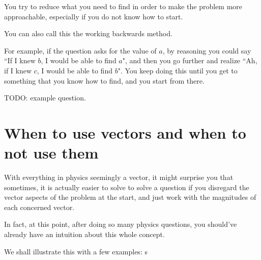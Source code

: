 \documentclass[11pt]{article}
\begin{document}
	You try to reduce what you need to find in order to make the problem more approachable, especially if you do not know how to start. 
	
	You can also call this the working backwards method. 
	
	For example, if the question asks for the value of $a$, by reasoning you could say ``If I knew $b$, I would be able to find $a$", and then you go further and realize ``Ah, if I knew $c$, I would be able to find $b$". You keep doing this until you get to something that you know how to find, and you start from there. 
	
	TODO: example question.
	
	\section{When to use vectors and when to not use them}
	With everything in physics seemingly a vector, it might surprise you that sometimes, it is actually easier to solve to solve a question if you disregard the vector aspects of the problem at the start, and just work with the magnitudes of each concerned vector.
	
	In fact, at this point, after doing so many physics questions, you should've already have an intuition about this whole concept.
	
	We shall illustrate this with a few examples: s
\end{document}
